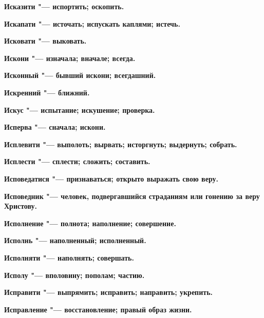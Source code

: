 \begin{multicols}{2}
\bfseries Исказити\normalfont{} "--- испортить; оскопить. 




\bfseries Искапати\normalfont{} "--- источать; испускать каплями; истечь. 




\bfseries Исковати\normalfont{} "--- выковать. 




\bfseries Искони\normalfont{} "--- изначала; вначале; всегда. 




\bfseries Исконный\normalfont{} "--- бывший искони; всегдашний. 




\bfseries Искренний\normalfont{} "--- ближний. 




\bfseries Искус\normalfont{} "--- испытание; искушение; проверка. 




\bfseries Исперва\normalfont{} "--- сначала; искони. 




\bfseries Исплевити\normalfont{} "--- выполоть; вырвать; исторгнуть; выдернуть; собрать. 




\bfseries Исплести\normalfont{} "--- сплести; сложить; составить. 




\bfseries Исповедатися\normalfont{} "--- признаваться; открыто выражать свою веру. 




\bfseries Исповедник\normalfont{} "--- человек, подвергавшийся страданиям или гонению за веру Христову. 




\bfseries Исполнение\normalfont{} "--- полнота; наполнение; совершение. 




\bfseries Исполнь\normalfont{} "--- наполненный; исполненный. 




\bfseries Исполняти\normalfont{} "--- наполнять; совершать. 




\bfseries Исполу\normalfont{} "--- вполовину; пополам; частию. 




\bfseries Исправити\normalfont{} "--- выпрямить; исправить; направить; укрепить. 




\bfseries Исправление\normalfont{} "--- восстановление; правый образ жизни. 





\end{multicols}
